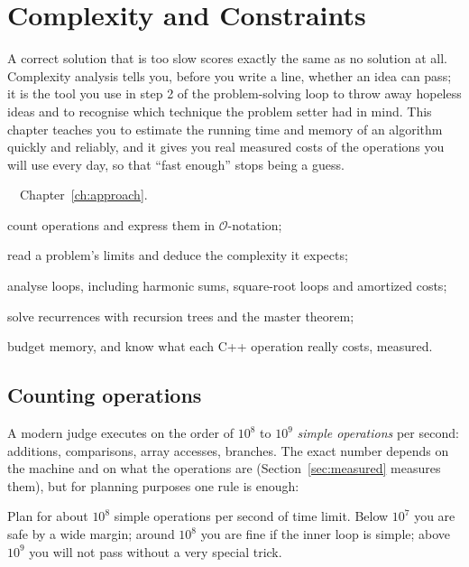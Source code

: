 \chapter{Complexity and Constraints}\label{ch:complexity}

A correct solution that is too slow scores exactly the same as no solution at all. Complexity analysis tells you, before
you write a line, whether an idea can pass; it is the tool you use in step 2 of the problem-solving loop to throw away
hopeless ideas and to recognise which technique the problem setter had in mind. This chapter teaches you to estimate the
running time and memory of an algorithm quickly and reliably, and it gives you real measured costs of the operations you
will use every day, so that ``fast enough'' stops being a guess.

\begin{chapterintro}{\bronze\ \silver\ \gold}{Chapter~\ref{ch:approach}.}
  \item count operations and express them in $\mathcal{O}$-notation;
  \item read a problem's limits and deduce the complexity it expects;
  \item analyse loops, including harmonic sums, square-root loops and amortized costs;
  \item solve recurrences with recursion trees and the master theorem;
  \item budget memory, and know what each C++ operation really costs, measured.
\end{chapterintro}

\section[Counting operations]{Counting operations \hfill \bronze}\label{sec:counting-ops}

A modern judge executes on the order of $10^8$ to $10^9$ \emph{simple operations} per second: additions, comparisons,
array accesses, branches. The exact number depends on the machine and on what the operations are (Section~\ref{sec:measured}
measures them), but for planning purposes one rule is enough:

\begin{fact}
Plan for about $10^8$ simple operations per second of time limit. Below $10^7$ you are safe by a wide margin; around
$10^8$ you are fine if the inner loop is simple; above $10^9$ you will not pass without a very special trick.
\end{fact}

